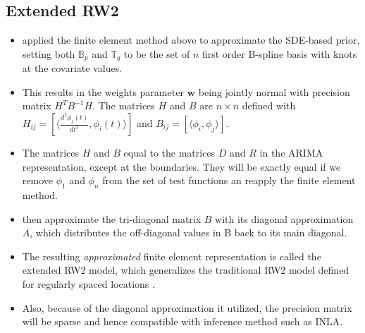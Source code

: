 \documentclass{beamer} %
\begin{document}
\subsection{Extended RW2}
\begin{frame}

\begin{itemize}

\item \cite{rw2} applied the finite element method above to approximate the SDE-based prior, setting both $\mathbb{B}_p$ and $\mathbb{T}_q$ to be the set of $n$ first order B-spline basis with knots at the covariate values.

\pause

\item This results in the weights parameter $\boldsymbol{w}$ being jointly normal with precision matrix $H^TB^{-1}H$. The matrices $H$ and $B$ are $n \times n$ defined with $H_{ij} = [\langle \frac{d^2\phi_j(t)}{dt^2} , \phi_i(t)\rangle]$ and $B_{ij}=[\langle \phi_i ,\phi_j\rangle]$.

\pause

\item The matrices $H$ and $B$ equal to the matrices $D$ and $R$ in the ARIMA representation, except at the boundaries. They will be exactly equal if we remove $\phi_1$ and $\phi_n$ from the set of test functions an reapply the finite element method.

\pause

\item \cite{rw2} then approximate the tri-diagonal matrix $B$ with its diagonal approximation $A$, which distributes the off-diagonal values in B back to its main diagonal.

\end{itemize}

\end{frame}


\begin{frame}
\begin{itemize}
\item The resulting \textit{approximated} finite element representation is called the extended RW2 model, which generalizes the traditional RW2 model defined for regularly spaced locations \citep{rue2005gaussian}.

\pause

\item Also, because of the diagonal approximation it utilized, the precision matrix will be sparse and hence compatible with inference method such as INLA.
\end{itemize}
\end{frame}
\end{document}
